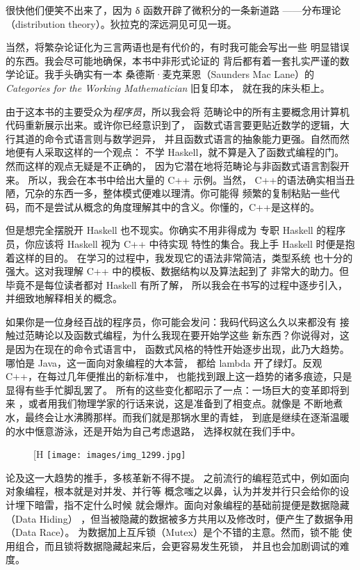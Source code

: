 很快他们便笑不出来了，因为 δ 函数开辟了微积分的一条新道路
——分布理论（distribution theory）。狄拉克的深远洞见可见一斑。


当然，将繁杂论证化为三言两语也是有代价的，有时我可能会写出一些
明显错误的东西。我会尽可能地确保，本书中非形式论证的
背后都有着一套扎实严谨的数学论证。我手头确实有一本
桑德斯·麦克莱恩（Saunders Mac Lane）的\emph{Categories for the Working Mathematician} 旧复印本，
就在我的床头柜上。

由于这本书的主要受众为\emph{程序员}，所以我会将
范畴论中的所有主要概念用计算机代码重新展示出来。或许你已经意识到了，
函数式语言要更贴近数学的逻辑，大行其道的命令式语言则与数学迥异，
并且函数式语言的抽象能力更强。自然而然地便有人采取这样的一个观点：
不学 Haskell，就不算是入了函数式编程的门。
然而这样的观点无疑是不正确的，
因为它潜在地将范畴论与非函数式语言割裂开来。
所以，我会在本书中给出大量的 C++ 示例。当然，
C++的语法确实相当丑陋，冗杂的东西一多，整体模式便难以理清。你可能得
频繁的复制粘贴一些代码，而不是尝试从概念的角度理解其中的含义。你懂的，C++是这样的。



但是想完全摆脱开 Haskell 也不现实。你确实不用非得成为
专职 Haskell 的程序员，你应该将 Haskell 视为 C++ 中待实现
特性的集合。我上手 Haskell 时便是抱着这样的目的。
在学习的过程中，我发现它的语法非常简洁，类型系统
也十分的强大。这对我理解 C++ 中的模板、数据结构以及算法起到了
非常大的助力。但毕竟不是每位读者都对 Haskell 有所了解，
所以我会在书写的过程中逐步引入，并细致地解释相关的概念。


如果你是一位身经百战的程序员，你可能会发问：我码代码这么久以来都没有
接触过范畴论以及函数式编程，为什么我现在要开始学这些
新东西？你说得对，这是因为在现在的命令式语言中，
函数式风格的特性开始逐步出现，此乃大趋势。
哪怕是 Java，这一面向对象编程的大本营，
都给 lambda 开了绿灯。反观 C++，在每过几年便推出的新标准中，
也能找到跟上这一趋势的诸多痕迹，只是显得有些手忙脚乱罢了。
所有的这些变化都昭示了一点：一场巨大的变革即将到来
，或者用我们物理学家的行话来说，这是准备到了相变点。就像是
不断地煮水，最终会让水沸腾那样。而我们就是那锅水里的青蛙，
到底是继续在逐渐温暖的水中惬意游泳，还是开始为自己考虑退路，
选择权就在我们手中。

\begin{figure}[H
  \centering
  \texttt{[image: images/img\_1299.jpg]}
\end{figure}

\noindent
论及这一大趋势的推手，多核革新不得不提。
之前流行的编程范式中，例如面向对象编程，根本就是对并发、并行等
概念嗤之以鼻，认为并发并行只会给你的设计埋下暗雷，指不定什么时候
就会爆炸。面向对象编程的基础前提便是数据隐藏（Data Hiding）
，但当被隐藏的数据被多方共用以及修改时，便产生了数据争用（Data Race）。
为数据加上互斥锁（Mutex）是个不错的主意。然而，锁不能
使用组合，而且锁将数据隐藏起来后，会更容易发生死锁，
并且也会加剧调试的难度。



